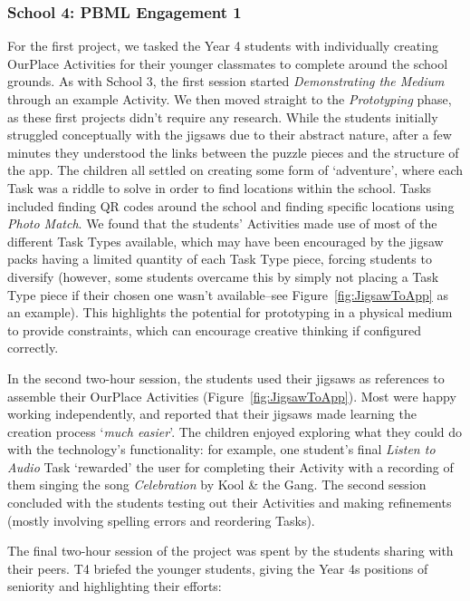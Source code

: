 \subsubsection{School 4: PBML Engagement 1}
For the first project, we tasked the Year 4 students with individually creating OurPlace Activities for their younger classmates to complete around the school grounds. As with School 3, the first session started \textit{Demonstrating the Medium} through an example Activity. We then moved straight to the \textit{Prototyping} phase, as these first projects didn't require any research. While the students initially struggled conceptually with the jigsaws due to their abstract nature, after a few minutes they understood the links between the puzzle pieces and the structure of the app. The children all settled on creating some form of `adventure', where each Task was a riddle to solve in order to find locations within the school. Tasks included finding QR codes around the school and finding specific locations using \textit{Photo Match}. We found that the students' Activities made use of most of the different Task Types available, which may have been encouraged by the jigsaw packs having a limited quantity of each Task Type piece, forcing students to diversify (however, some students overcame this by simply not placing a Task Type piece if their chosen one wasn't available--see Figure~\ref{fig:JigsawToApp} as an example). This highlights the potential for prototyping in a physical medium to provide constraints, which can encourage creative thinking if configured correctly.

In the second two-hour session, the students used their jigsaws as references to assemble their OurPlace Activities (Figure~\ref{fig:JigsawToApp}). Most were happy working independently, and reported that their jigsaws made learning the creation process `\textit{much easier}'. The children enjoyed exploring what they could do with the technology's functionality: for example, one student's final \textit{Listen to Audio} Task `rewarded' the user for completing their Activity with a recording of them singing the song \textit{Celebration} by Kool \& the Gang. The second session concluded with the students testing out their Activities and making refinements (mostly involving spelling errors and reordering Tasks). 

The final two-hour session of the project was spent by the students sharing with their peers. T4 briefed the younger students, giving the Year 4s positions of seniority and highlighting their efforts:

